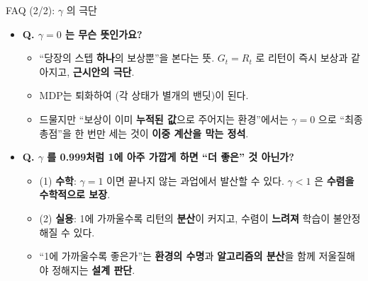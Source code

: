 \documentclass[aspectratio=169,11pt]{beamer}
\begin{document}
\begin{frame}{FAQ (2/2): $\gamma$ 의 극단}
  \begin{itemize}
    \item \textbf{Q. $\gamma = 0$ 는 무슨 뜻인가요?}
      \begin{itemize}
        \item ``당장의 스텝 \textbf{하나}의 보상뿐''을 본다는 뜻.
          $G_t = R_t$ 로 리턴이 즉시 보상과 같아지고,
          \textbf{근시안의 극단}.
        \item MDP는 퇴화하여 (각 상태가 별개의
          밴딧)이 된다.
        \item 드물지만 ``보상이 이미 \textbf{누적된 값}으로
          주어지는 환경''에서는 $\gamma = 0$ 으로 ``최종
          총점''을 한 번만 세는 것이 \textbf{이중 계산을 막는
          정석}.
      \end{itemize}
    \item \textbf{Q. $\gamma$ 를 0.999처럼 1에 아주 가깝게 하면
      ``더 좋은'' 것 아닌가?}
      \begin{itemize}
        \item (1) \textbf{수학}: $\gamma = 1$ 이면 끝나지 않는
          과업에서 발산할 수 있다. $\gamma < 1$ 은 \textbf{수렴을
          수학적으로 보장}.
        \item (2) \textbf{실용}: 1에 가까울수록 리턴의
          \textbf{분산}이 커지고, 수렴이 \textbf{느려져} 학습이
          불안정해질 수 있다.
        \item ``1에 가까울수록 좋은가''는 \textbf{환경의 수명}과
          \textbf{알고리즘의 분산}을 함께 저울질해야 정해지는
          \textbf{설계 판단}.
      \end{itemize}
  \end{itemize}
\end{frame}
\end{document}
